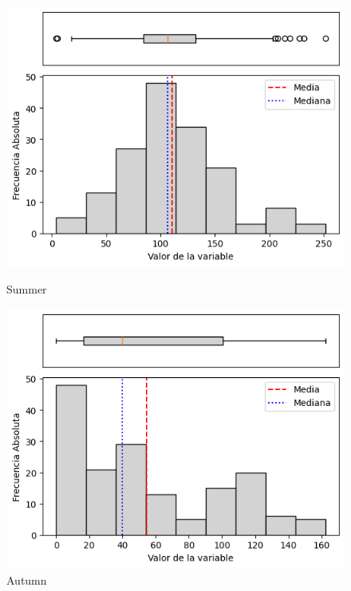 \begin{figure}[H]
\centering
\begin{minipage}{0.30\textwidth}
  \includegraphics[width=\linewidth]{resultados/por_estacion_del_anio/boxplot_clases_por_estacion/Andahuaylas/P_HistBoxplot_Summer.png}
  \caption*{Summer}
\end{minipage}
\hfill
\begin{minipage}{0.30\textwidth}
  \includegraphics[width=\linewidth]{resultados/por_estacion_del_anio/boxplot_clases_por_estacion/Andahuaylas/P_HistBoxplot_Autumn.png}
  \caption*{Autumn}
\end{minipage}

\vspace{0.2cm}


\end{figure}
